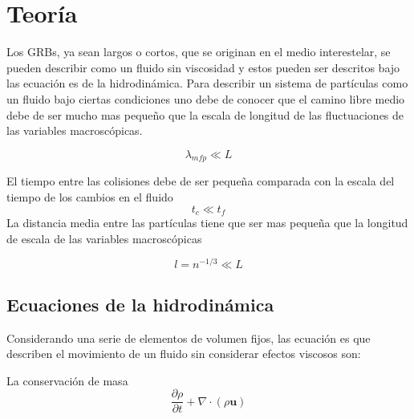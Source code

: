 \documentclass[12pt,a4paper]{book}
\begin{document}

\chapter{Teoría}

Los GRBs, ya sean largos o cortos, que se originan en el medio interestelar, se pueden describir como un fluido sin viscosidad y estos pueden ser descritos bajo
las ecuación  es de la hidrodinámica.
Para describir un sistema de partículas como un fluido bajo ciertas condiciones uno debe de conocer que el camino libre medio debe de ser mucho mas pequeño que la escala de longitud de las fluctuaciones de las variables macroscópicas.

\begin{equation}
\lambda_{mfp} \ll L
\end{equation}

El tiempo entre las colisiones debe de ser pequeña comparada con la escala del tiempo de los cambios en el fluido
\begin{equation}
t_{c} \ll t_f
\end{equation}
La distancia media entre las partículas tiene que ser mas pequeña que la longitud de escala de las variables macroscópicas

\begin{equation}
l = n^{-1/3} \ll L
\end{equation}



\section{Ecuaciones de la hidrodinámica}

Considerando una serie de elementos de volumen fijos, las ecuación  es que describen el movimiento de un fluido sin considerar efectos viscosos son:

La conservación de masa
\begin{equation} \label{conservación_masa_hidrodinamica}
\dfrac{\partial \rho }{\partial t} + \nabla \cdot \left( \rho \mathbf{u} \right)
\end{equation}
\end{document}
